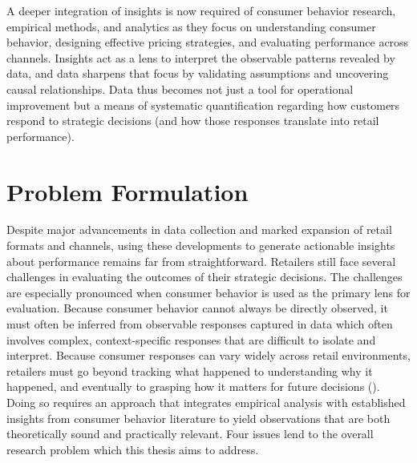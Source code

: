 A deeper integration of insights is now required of consumer behavior research, empirical methods, and analytics as they focus on understanding consumer behavior, designing effective pricing strategies, and evaluating performance across channels. Insights act as a lens to interpret the observable patterns revealed by data, and data sharpens that focus by validating assumptions and uncovering causal relationships. Data thus becomes not just a tool for operational improvement but a means of systematic quantification regarding how customers respond to strategic decisions (and how those responses translate into retail performance).

\section{Problem Formulation}
Despite major advancements in data collection and marked expansion of retail formats and channels, using these developments to generate actionable insights about performance remains far from straightforward. Retailers still face several challenges in evaluating the outcomes of their strategic decisions. The challenges are especially pronounced when consumer behavior is used as the primary lens for evaluation. Because consumer behavior cannot always be directly observed, it must often be inferred from observable responses captured in data which often involves complex, context-specific responses that are difficult to isolate and interpret. Because consumer responses can vary widely across retail environments, retailers must go beyond tracking what happened to understanding why it happened, and eventually to grasping how it matters for future decisions (\cite{McKinsey-Company2025-qo}). Doing so requires an approach that integrates empirical analysis with established insights from consumer behavior literature to yield observations that are both theoretically sound and practically relevant. Four issues lend to the overall research problem which this thesis aims to address.

